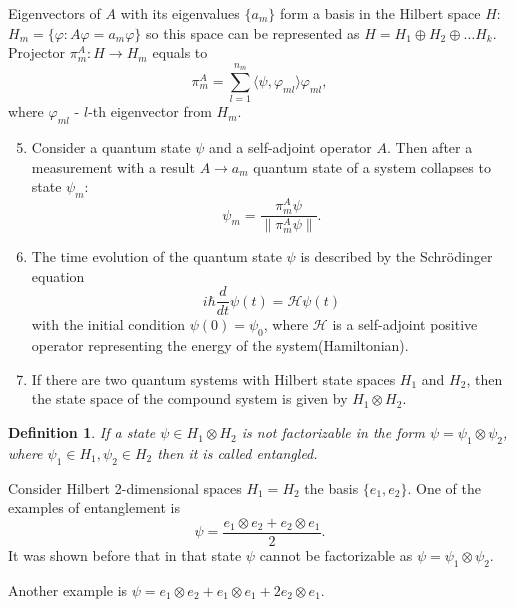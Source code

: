 \documentclass[%
master,         %
subf,           %
href,           %
colorlinks=true %
]{disser}
\numberwithin{equation}{section}
\numberwithin{figure}{section}
\newtheorem{definition}{Definition}[section]
\begin{document}
Eigenvectors of $A$ with its eigenvalues $\{a_m\}$ form a basis in the Hilbert space $H$: $H_m = \{ \varphi: A\varphi = a_m\varphi\}$ so this space can be represented as $H = H_1\oplus H_2\oplus\ldots H_k$. Projector $\pi_m^A: H\to H_m$ equals to 
  \[
  \pi_m^A = \sum_{l = 1}^{n_m}\langle\psi,\varphi_{ml}\rangle\varphi_{ml},
  \]
where $\varphi_{ml}$ - $l$-th eigenvector from $H_m$.
\begin{enumerate}[label=\bfseries Postulate \arabic*:, align=left]
  \setcounter{enumi}{4}
  \item Consider a quantum state $\psi$ and a self-adjoint operator $A$. 
  Then after a measurement with a result $A \to a_m$ quantum state of a system collapses to state $\psi_m$:
  \[
  \psi_m = \frac{\pi_m^A\psi}{ \| \pi_m^A\psi\|}.
  \] 
  \item The time evolution of the quantum state $\psi$ is described by the Schr\"{o}dinger equation
  \[
  i\hbar \dfrac{d}{dt}\psi(t) = \mathcal{\mathcal{H}}\psi(t)
  \] 
  with the initial condition $\psi(0) = \psi_0$,
  where $\mathcal{H}$ is a self-adjoint positive operator representing the energy of the system(Hamiltonian).
  \item If there are two quantum systems with Hilbert state spaces $H_1$ and $H_2$, then the state space of the compound system is given by $H_1 \otimes H_2$.  
\end{enumerate}
\begin{definition}
If a state $\psi\in H_1\otimes H_2$ is not factorizable in the form $\psi = \psi_1\otimes\psi_2$, where $\psi_1\in H_1, \psi_2\in H_2$ then it is called entangled.
\end{definition}  
Consider Hilbert 2-dimensional spaces $H_1 = H_2$ the basis $\{e_1, e_2\}$. One of the examples of entanglement is 
\[
\psi = \frac{e_1\otimes e_2 + e_2\otimes e_1}{2}.
\]
It was shown before that in that state $\psi$ cannot be factorizable as $\psi = \psi_1\otimes\psi_2$.

Another example is $\psi = e_1\otimes e_2 + e_1 \otimes e_1 + 2e_2 \otimes e_1$.
\end{document}
